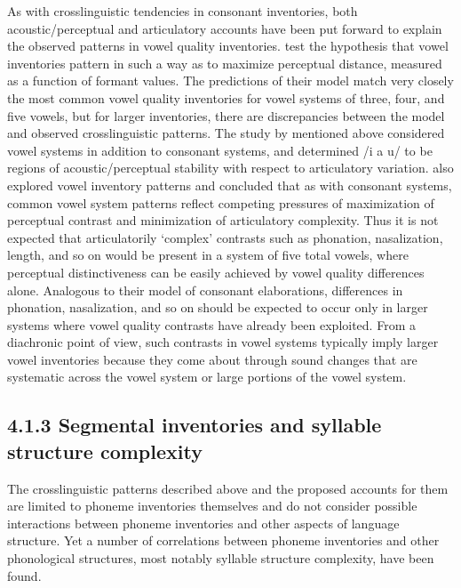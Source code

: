   As with crosslinguistic tendencies in consonant inventories, both acoustic/perceptual and articulatory accounts have been put forward to explain the observed patterns in vowel quality inventories. \citet{LiljencrantsLindblom1972} test the hypothesis that vowel inventories pattern in such a way as to maximize perceptual distance, measured as a function of formant values. The predictions of their model match very closely the most common vowel quality inventories for vowel systems of three, four, and five vowels, but for larger inventories, there are discrepancies between the model and observed crosslinguistic patterns. The study by \citet{Stevens1989} mentioned above considered vowel systems in addition to consonant systems, and determined /i a u/ to be regions of acoustic/perceptual stability with respect to articulatory variation. \citet{LindblomMaddieson1988} also explored vowel inventory patterns and concluded that as with consonant systems, common vowel system patterns reflect competing pressures of maximization of perceptual contrast and minimization of articulatory complexity. Thus it is not expected that articulatorily ‘complex’ contrasts such as phonation, nasalization, length, and so on would be present in a system of five total vowels, where perceptual distinctiveness can be easily achieved by vowel quality differences alone. Analogous to their model of consonant elaborations, differences in phonation, nasalization, and so on should be expected to occur only in larger systems where vowel quality contrasts have already been exploited. From a diachronic point of view, such contrasts in vowel systems typically imply larger vowel inventories because they come about through sound changes that are systematic across the vowel system or large portions of the vowel system.

\subsection{4.1.3 Segmental inventories and syllable structure complexity}

  The crosslinguistic patterns described above and the proposed accounts for them are limited to phoneme inventories themselves and do not consider possible interactions between phoneme inventories and other aspects of language structure. Yet a number of correlations between phoneme inventories and other phonological structures, most notably syllable structure complexity, have been found.

